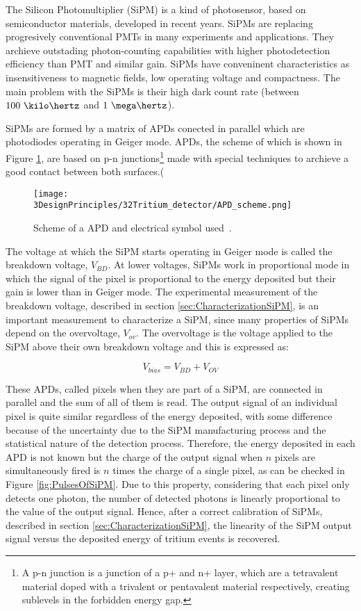 The Silicon Photomultiplier (SiPM) is a kind of photosensor, based on semiconductor materials, developed in recent years. SiPMs are replacing progresively conventional PMTs in many experiments and applications. They archieve outstading photon-counting capabilities with higher photodetection efficiency than PMT and similar gain. SiPMs have conveninent characteristics as insensitiveness to magnetic fields, low operating voltage and compactness. The main problem with the SiPMs is their high dark count rate (between $100~\kilo\hertz$ and $1~\mega\hertz$).

SiPMs are formed by a matrix of APDs conected in parallel which are photodiodes operating in Geiger mode. APDs, the scheme of which is shown in Figure \ref{fig:SchemeAPD}, are based on p-n junctions\footnote{A p-n junction is a junction of a p+ and n+ layer, which are a tetravalent material doped with a trivalent or pentavalent material respectively, creating sublevels in the forbidden energy gap.} made with special techniques to archieve a good contact between both surfaces.(

\begin{figure}[htbp]
\centering
\texttt{[image: 3DesignPrinciples/32Tritium\_detector/APD\_scheme.png]}
\caption{Scheme of a APD and electrical symbol used\label{fig:SchemeAPD}~\cite{OSI}.}
\end{figure}
 

The voltage at which the SiPM starts operating in Geiger mode is called the breakdown voltage, $V_ {BD}$. At lower voltages, SiPMs work in proportional mode in which the signal of the pixel is proportional to the energy deposited but their gain is lower than in Geiger mode. The experimental measurement of the breakdown voltage, described in section \ref{sec:CharacterizationSiPM}, is an important measurement to characterize a SiPM, since many properties of SiPMs depend on the overvoltage, $V_{ov}$. The overvoltage is the voltage applied to the SiPM above their own breakdown voltage and this is expressed as:

\begin{equation}
V_{bias}=V_{BD}+V_{OV}
\label{overvoltage}
\end{equation}

These APDs, called pixels when they are part of a SiPM, are connected in parallel and the sum of all of them is read. The output signal of an individual pixel is quite similar regardless of the energy deposited, with some difference because of the uncertainty due to the SiPM manufacturing process and the statistical nature of the detection process. Therefore, the energy deposited in each APD is not known but the charge of the output signal when $n$ pixels are simultaneously fired is $n$ times the charge of a single pixel, as can be checked in Figure \ref{fig:PulsesOfSiPM}. Due to this property, considering that each pixel only detects one photon, the number of detected photons is linearly proportional to the value of the output signal. Hence, after a correct calibration of SiPMs, described in section \ref{sec:CharacterizationSiPM}, the linearity of the SiPM output signal versus the deposited energy of tritium events is recovered.

